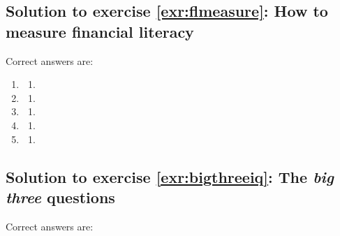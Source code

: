 \documentclass[
  12pt,
  oneside]{book}
\providecommand{\tightlist}{%
  \setlength{\itemsep}{0pt}\setlength{\parskip}{0pt}}
\theoremstyle{definition}
\theoremstyle{definition}
\theoremstyle{definition}
\theoremstyle{definition}
\theoremstyle{remark}
\begin{document}
\subsection*{Solution to exercise \ref{exr:flmeasure}: How to measure financial literacy}\label{sol:flmeasure}

Correct answers are:

\begin{enumerate}
\def\labelenumi{\arabic{enumi}.}
\tightlist
\item
  \begin{enumerate}
  \def\labelenumii{\alph{enumii})}
  \setcounter{enumii}{1}
  \tightlist
  \item
  \end{enumerate}
\item
  \begin{enumerate}
  \def\labelenumii{\alph{enumii})}
  \setcounter{enumii}{1}
  \tightlist
  \item
  \end{enumerate}
\item
  \begin{enumerate}
  \def\labelenumii{\alph{enumii})}
  \setcounter{enumii}{1}
  \tightlist
  \item
  \end{enumerate}
\item
  \begin{enumerate}
  \def\labelenumii{\alph{enumii})}
  \tightlist
  \item
  \end{enumerate}
\item
  \begin{enumerate}
  \def\labelenumii{\alph{enumii})}
  \tightlist
  \item
  \end{enumerate}
\end{enumerate}

\subsection*{\texorpdfstring{Solution to exercise \ref{exr:bigthreeiq}: The \emph{big three} questions}{Solution to exercise \ref{exr:bigthreeiq}: The big three questions}}\label{sol:bigthreeiq}

Correct answers are:
\end{document}

